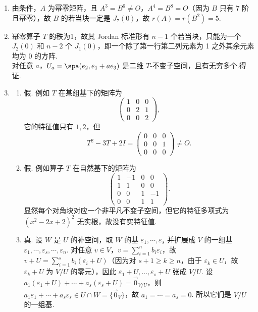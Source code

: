 \begin{enumerate}
    \item 由条件，$A$ 为幂零矩阵，且 $A^3=B^6\neq O$，$A^4=B^8=O$（因为 $B$ 只有 $7$ 阶且幂零），故 $B$ 的若当块一定是 $J_7(0)$，故 $r(A)=r(B^2)=5$.

    \item 幂零算子 $T$ 的秩为1，故其 Jordan 标准形有 $n-1$ 个若当块，只能为一个 $J_2(0)$ 和 $n-2$ 个 $J_1(0)$，即一个除了第一行第二列元素为 1 之外其余元素均为 0 的方阵. \\
    对任意 $a$，$U_a=\spa(e_2,e_1+ae_3)$ 是二维 $T$-不变子空间，且有无穷多个.得证.

    \item
    \begin{enumerate}
        \item 假. 例如 $T$ 在某组基下的矩阵为
        \[
            \begin{pmatrix}1&0&0\\0&2&1\\0&0&2\end{pmatrix},
        \]
        它的特征值只有 $1,2$，但
        \[
            T^2-3T+2I=
            \begin{pmatrix}0&0&0\\0&0&1\\0&0&0\end{pmatrix}\neq O.
        \]

        \item 假. 例如算子 $T$ 在自然基下的矩阵为
        \[
            \begin{pmatrix}
                1&-1&0&0\\
                1&1&0&0\\
                0&0&1&-1\\
                0&0&1&1
            \end{pmatrix}.
        \]
        显然每个对角块对应一个非平凡不变子空间，但它的特征多项式为 $(x^2-2x+2)^2$ 无实根，故没有实特征值.

        \item 真. 设 $W$ 是 $U$ 的补空间，取 $W$ 的基 $\varepsilon_1,\cdots,\varepsilon_s$ 并扩展成 $V$ 的一组基 $\varepsilon_1,\cdots,\varepsilon_s,\cdots,\varepsilon_n$. 对任意 $v \in V$，$v =\displaystyle\sum_{i=1}^n b_i \varepsilon_i$，故 $v + U = \displaystyle\sum_{i=1}^s b_i(\varepsilon_i + U)$（因为对 $s+1\geqslant k\geqslant n$，由于 $\varepsilon_k \in U$，故 $\varepsilon_k+U$ 为 $V/U$ 的零元），因此 $\varepsilon_1 + U, \ldots, \varepsilon_s + U$ 张成 $V/U$. 设 $a_1(\varepsilon_1+U)+\cdots+a_s(\varepsilon_s+U)=\vec{0}_{V/U}$，则 $a_1\varepsilon_1+\cdots+a_s\varepsilon_s\in U\cap W=\{\vec{0}_V\}$，故 $a_1=\cdots=a_s=0$. 所以它们是 $V/U$ 的一组基.


\end{enumerate}
\end{enumerate}
